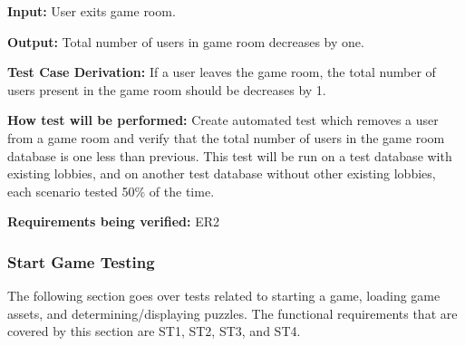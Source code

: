 \documentclass[12pt, titlepage]{article}
\begin{document}
\begin{enumerate}
\textbf{Input:} User exits game room.

\textbf{Output:} Total number of users in game room decreases by one.

\textbf{Test Case Derivation:} If a user leaves the game room, the total number of users present in the game room should be decreases by 1.

\textbf{How test will be performed:} Create automated test which removes a user from a game room and verify that the total number of users in the game room database is one less than previous. This test will be run on a test database with existing lobbies, and on another test database without other existing lobbies, each scenario tested 50\% of the time.

\textbf{Requirements being verified: } ER2

\end{enumerate}

\subsubsection{Start Game Testing}
The following section goes over tests related to starting a game, loading game assets, and determining/displaying puzzles. The functional requirements that are covered by this section are ST1, ST2, ST3, and ST4.
\end{document}
